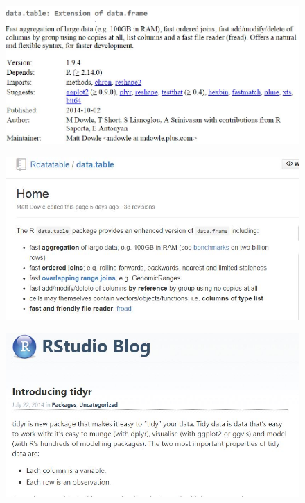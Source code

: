 \documentclass{beamer}
\begin{document}
\begin{frame}
	\begin{figure}
		\centering
		\includegraphics[width=1.15\linewidth]{tenpack03}
		
	\end{figure}
	
\end{frame}
\begin{frame}
	\begin{figure}
		\centering
		\includegraphics[width=1.15\linewidth]{tenpack04}
		
	\end{figure}
	
\end{frame}

\begin{frame}
	\begin{figure}
		\centering
		\includegraphics[width=1.15\linewidth]{tidyr}
		
	\end{figure}
	
\end{frame}
\end{document}
